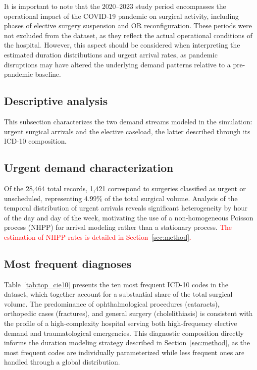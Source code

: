 \documentclass[sn-mathphys-num]{sn-jnl}
\begin{document}
It is important to note that the 2020--2023 study period encompasses
the operational impact of the COVID-19 pandemic on surgical activity,
including phases of elective surgery suspension and OR reconfiguration. These periods were not excluded from the dataset,
as they reflect the actual operational conditions of the hospital.
However, this aspect should be considered when interpreting the
estimated duration distributions and urgent arrival rates, as pandemic
disruptions may have altered the underlying demand patterns relative
to a pre-pandemic baseline.

\subsection{Descriptive analysis}\label{descriptive-statistics}

This subsection characterizes the two demand streams modeled in the
simulation: urgent surgical arrivals and the elective caseload,
the latter described through its ICD-10 composition.

\subsection*{Urgent demand characterization}

Of the 28{,}464 total records, 1{,}421 correspond to surgeries
classified as urgent or unscheduled, representing 4.99\% of the total
surgical volume. Analysis of the temporal distribution of urgent
arrivals reveals significant heterogeneity by hour of the day and day
of the week, motivating the use of a
non-homogeneous Poisson process (NHPP) for arrival modeling rather
than a stationary process. \textcolor{red}{The estimation of NHPP rates is detailed
in Section~\ref{sec:method}.}



\subsection*{Most frequent diagnoses}

Table~\ref{tab:top_cie10} presents the ten most frequent ICD-10 codes
in the dataset, which together account for a substantial share of the
total surgical volume. The predominance of ophthalmological procedures
(cataracts), orthopedic cases (fractures), and general surgery
(cholelithiasis) is consistent with the profile of a high-complexity
hospital serving both high-frequency elective demand and traumatological
emergencies. This diagnostic composition directly informs the duration
modeling strategy described in Section~\ref{sec:method}, as the most
frequent codes are individually parameterized while less frequent ones
are handled through a global distribution.
\end{document}
